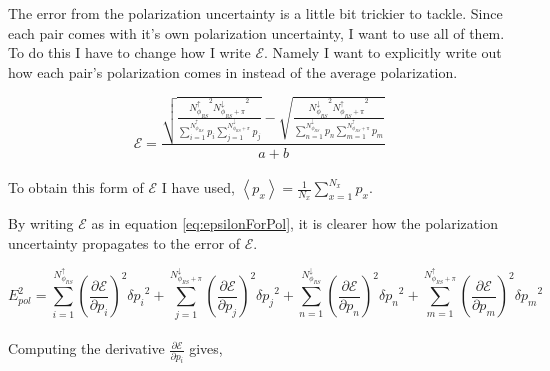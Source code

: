 \documentclass[abstract = on,listof=totoc, bibliography=totoc]{scrreprt}
\newcommand{\phirs}{\phi_{RS}}
\begin{document}
The error from the polarization uncertainty is a little bit trickier to tackle. Since each pair comes with it's own polarization uncertainty, I want to use all of them. To do this I have to change how I write $\mathcal{E}$. Namely I want to explicitly write out how each pair's polarization comes in instead of the average polarization. 

\begin{equation}
\label{eq:epsilonForPol}
\mathcal{E} = \frac{   \sqrt{\frac{{N^\uparrow_{\phirs}}^2 {N^\downarrow_{\phirs+\pi}}^2}{\sum\limits_{i=1}^{N^\uparrow_{\phirs}} p_i \sum\limits_{j=1}^{N^\downarrow_{\phirs+\pi}} p_j}} - \sqrt{\frac{{N^\downarrow_{\phirs}}^2 {N^\uparrow_{\phirs+\pi}}^2}{\sum\limits_{n=1}^{N^\downarrow_{\phirs}} p_n \sum\limits_{m=1}^{N^\uparrow_{\phirs+\pi}} p_m}}   }  {a+b}
\end{equation}\\
%
To obtain this form of $\mathcal{E}$ I have used, $\left<p_x\right> = \frac{1}{N_x}\sum\limits_{x=1}^{N_x} p_x$. 

By writing $\mathcal{E}$ as in equation \ref{eq:epsilonForPol}, it is clearer how the polarization uncertainty propagates to the error of $\mathcal{E}$.

\begin{equation}
\label{eq:Epol}
E_{pol}^2 = \sum\limits_{i=1}^{N^\uparrow_{\phirs}} \left(\frac{\partial\mathcal{E}}{\partial p_i}\right)^2 {\delta p_i}^2 + \sum\limits_{j=1}^{N^\downarrow_{\phirs+\pi}} \left(\frac{\partial\mathcal{E}}{\partial p_j}\right)^2  {\delta p_j}^2 + \sum\limits_{n=1}^{N^\downarrow_{\phirs}}\left(\frac{\partial\mathcal{E}}{\partial p_n}\right)^2  {\delta p_n}^2 +\sum\limits_{m=1}^{N^\uparrow_{\phirs+\pi}} \left(\frac{\partial\mathcal{E}}{\partial p_m}\right)^2  {\delta p_m}^2
\end{equation}\\
%
Computing the derivative $\frac{\partial\mathcal{E}}{\partial p_i}$ gives, 
\end{document}
